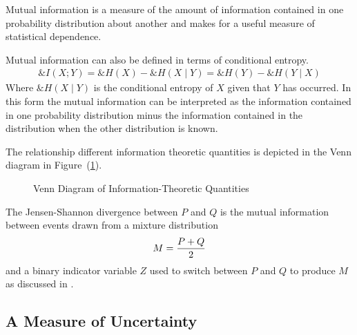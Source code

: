 \begin{remark}
  Mutual information is a measure of the amount of information contained in one
  probability distribution about another and makes for a useful measure of
  statistical dependence.
\end{remark}

\begin{remark} Mutual information can also be defined in terms of conditional
  entropy.
  \begin{align}
    \label{eq:mutual-information-alt}
    \&I(X; Y) = \&H(X) - \&H(X \mid Y) = \&H(Y) - \&H(Y \mid X)
  \end{align}
  Where $\&H(X \mid Y)$ is the conditional entropy of $X$ given that $Y$ has
  occurred. In this form the mutual information can be interpreted as the
  information contained in one probability distribution minus the information
  contained in the distribution when the other distribution is known.
  \end{remark}

  The relationship different information theoretic quantities is depicted in the
  Venn diagram in Figure~(\ref{fig:venn-information}).

\begin{figure}[h]
  \centering
  \caption{Venn Diagram of Information-Theoretic Quantities}
  \label{fig:venn-information}
\end{figure}

\begin{theorem}
  The Jensen-Shannon divergence between $P$ and $Q$ is the mutual
  information between events drawn from a mixture distribution
  \begin{align}
    \label{eq:M}
    M = {P + Q \over 2}
  \end{align}
  and a binary indicator variable $Z$ used to switch between $P$ and
  $Q$ to produce $M$ as discussed in \cite{ref:Schneidma-2003}.
\end{theorem}

\subsection{A Measure of Uncertainty}
\label{sec:info-value-function}

